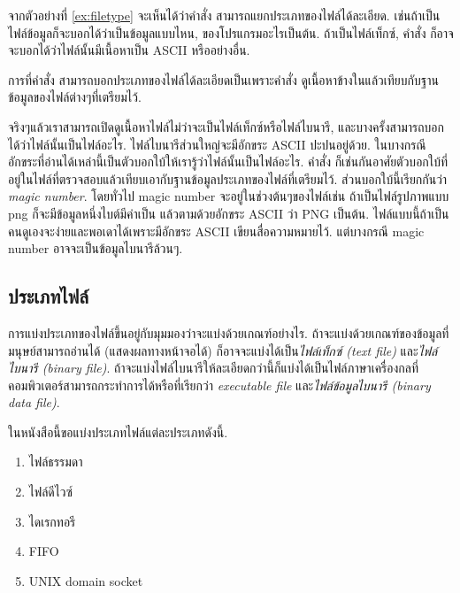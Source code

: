 \begin{thwbr}
จากตัวอย่างที่ \ref{ex:filetype} จะเห็นได้ว่าคำสั่ง  สามารถแยกประเภทของไฟล์ได้ละเอียด. เช่นถ้าเป็นไฟล์ข้อมูลก็จะบอกได้ว่าเป็นข้อมูลแบบไหน, ของโปรแกรมอะไรเป็นต้น. ถ้าเป็นไฟล์เท็กซ์, คำสั่ง  ก็อาจจะบอกได้ว่าไฟล์นั้นมีเนื้อหาเป็น ASCII หรืออย่างอื่น. 

การที่คำสั่ง  สามารถบอกประเภทของไฟล์ได้ละเอียดเป็นเพราะคำสั่ง  ดูเนื้อหาข้างในแล้วเทียบกับฐานข้อมูลของไฟล์ต่างๆที่เตรียมไว้. 

จริงๆแล้วเราสามารถเปิดดูเนื้อหาไฟล์ไม่ว่าจะเป็นไฟล์เท็กซ์หรือไฟล์ไบนารี, และบางครั้งสามารถบอกได้ว่าไฟล์นั้นเป็นไฟล์อะไร. ไฟล์ไบนารีส่วนใหญ่จะมีอักขระ ASCII ปะปนอยู่ด้วย. ในบางกรณีอักขระที่อ่านได้เหล่านี้เป็นตัวบอกใบ้ให้เรารู้ว่าไฟล์นั้นเป็นไฟล์อะไร. คำสั่ง  ก็เช่นกันอาศัยตัวบอกใบ้ที่อยู่ในไฟล์ที่ตรวจสอบแล้วเทียบเอากับฐานข้อมูลประเภทของไฟล์ที่เตรียมไว้. ส่วนบอกใบ้นี้เรียกกันว่า \emph{magic number}. %
%
โดยทั่วไป magic number จะอยู่ในช่วงต้นๆของไฟล์เช่น ถ้าเป็นไฟล์รูปภาพแบบ png ก็จะมีข้อมูลหนึ่งไบต์มีค่าเป็น  แล้วตามด้วยอักขระ ASCII ว่า PNG เป็นต้น. ไฟล์แบบนี้ถ้าเป็นคนดูเองจะง่ายและพอเดาได้เพราะมีอักขระ ASCII เขียนสื่อความหมายไว้. แต่บางกรณี magic number อาจจะเป็นข้อมูลไบนารีล้วนๆ.


\subsection{ประเภทไฟล์}
การแบ่งประเภทของไฟล์ขึ้นอยู่กับมุมมองว่าจะแบ่งด้วยเกณฑ์อย่างไร. ถ้าจะแบ่งด้วยเกณฑ์ของข้อมูลที่มนุษย์สามารถอ่านได้ (แสดงผลทางหน้าจอได้) ก็อาจจะแบ่งได้เป็น\emph{ไฟล์เท็กซ์ (text file)} และ\emph{ไฟล์ไบนารี (binary file)}. ถ้าจะแบ่งไฟล์ไบนารีให้ละเอียดกว่านี้ก็แบ่งได้เป็นไฟล์ภาษาเครื่องกลที่คอมพิวเตอร์สามารถกระทำการได้หรือที่เรียกว่า \emph{executable file} %
และ\emph{ไฟล์ข้อมูลไบนารี (binary data file)}.  %

ในหนังสือนี้ขอแบ่งประเภทไฟล์แต่ละประเภทดังนี้.
\begin{enumerate}
\item ไฟล์ธรรมดา
\item ไฟล์ดีไวซ์
\item ไดเรกทอรี
\item FIFO
\item UNIX domain socket
\end{enumerate}


\end{thwbr}
